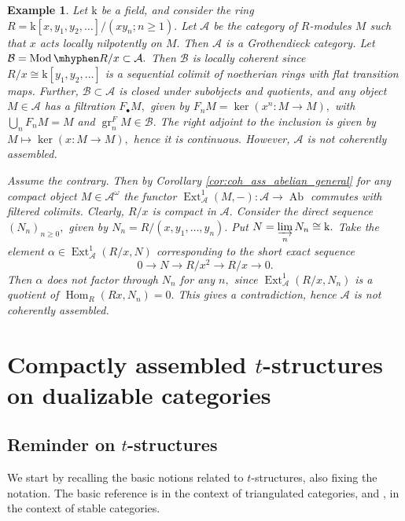 \documentclass[11pt,leqno]{amsart}
\newtheorem{example}[theo]{Example}
\numberwithin{equation}{section}
\def\Hom{\operatorname{Hom}}
\def\gr{\operatorname{gr}}
\newcommand{\hy}{\mhyphen}
\newcommand{\indlim}[1][]{\mathop{\varinjlim}\limits_{#1}}
\newcommand{\mk}{\mathrm k}
\newcommand{\cA}{{\mathcal A}}
\newcommand{\cB}{{\mathcal B}}
\newcommand{\Ab}{\operatorname{Ab}}
\newcommand{\Ext}{\operatorname{Ext}}
\newcommand{\Mod}{\operatorname{Mod}}
\begin{document}
\begin{example}
Let $\mk$ be a field, and consider the ring $R=\mk[x,y_1,y_2,\dots]/(xy_n; n\geq 1).$ Let $\cA$ be the category of $R$-modules $M$ such that $x$ acts locally nilpotently on $M.$ Then $\cA$ is a Grothendieck category. Let $\cB=\Mod\hy R/x\subset\cA.$ Then $\cB$ is locally coherent since $R/x\cong\mk[y_1,y_2,\dots]$ is a sequential colimit of noetherian rings with flat transition maps. Further, $\cB\subset\cA$ is closed under subobjects and quotients, and any object $M\in\cA$ has a filtration $F_{\bullet}M,$ given by $F_n M=\ker(x^n:M\to M),$ with $\bigcup\limits_n F_n M=M$ and $\gr_n^F M\in\cB.$ The right adjoint to the inclusion is given by $M\mapsto\ker(x:M\to M),$ hence it is continuous. However, $\cA$ is not coherently assembled.

Assume the contrary. Then by Corollary \ref{cor:coh_ass_abelian_general} for any compact object $M\in\cA^{\omega}$ the functor $\Ext_{\cA}^1(M,-):\cA\to\Ab$ commutes with filtered colimits. Clearly, $R/x$ is compact in $\cA.$ Consider the direct sequence $(N_n)_{n\geq 0},$ given by $N_n=R/(x,y_1,\dots,y_n).$ Put $N=\indlim[n]N_n\cong\mk.$ Take the element $\alpha\in\Ext^1_{\cA}(R/x,N)$ corresponding to the short exact sequence
\begin{equation*}
0\to N\to R/x^2\to R/x\to 0.
\end{equation*}
Then $\alpha$ does not factor through $N_n$ for any $n,$ since $\Ext^1_{\cA}(R/x,N_n)$ is a quotient of $\Hom_R(Rx,N_n)=0.$ This gives a contradiction, hence $\cA$ is not coherently assembled. 
\end{example}


\section{Compactly assembled $t$-structures on dualizable categories}
\label{sec:comp_ass_t_structures}

\subsection{Reminder on $t$-structures}
\label{ssec:reminder_on_t_structures}

We start by recalling the basic notions related to $t$-structures, also fixing the notation. The basic reference is \cite{BBD82} in the context of triangulated categories, and \cite[Section 1.2]{Lur17a}, \cite[Appendix C]{Lur18} in the context of stable categories. 
\end{document}
